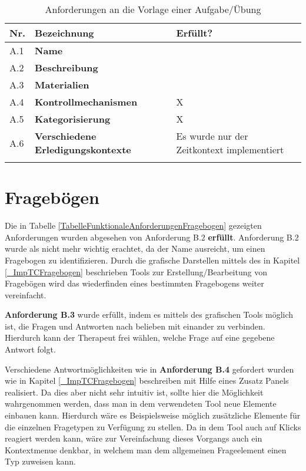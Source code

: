 \begin{table}[htbp]
	\begin{center}
		\begin{tabular}{p{} p{} p{}}
			\rowcolor{black!20} \textbf{Nr.} & \textbf{Bezeichnung} & \textbf{Erfüllt?} \\ \toprule 
			A.1 & \textbf{Name} & \checkmark \\ \hline \addlinespace
			A.2 & \textbf{Beschreibung} & \checkmark \\ \hline \addlinespace
			A.3 & \textbf{Materialien} & \checkmark \\ \hline \addlinespace
			A.4 & \textbf{Kontrollmechanismen} & X \\ \hline \addlinespace
			A.5 & \textbf{Kategorisierung} & X  \\ \hline \addlinespace
			A.6 & \textbf{Verschiedene Erledigungskontexte} & Es wurde nur der Zeitkontext implementiert \\ \hline \addlinespace
		\end{tabular}
	\end{center}
	\caption[Anforderungen an die Vorlage einer Aufgabe/Übung]{Anforderungen an die Vorlage einer Aufgabe/Übung}
	\label{TabelleAnforderungsabgleichVorlagen}
\end{table}

\section{Fragebögen}
Die in Tabelle \ref{TabelleFunktionaleAnforderungenFragebogen} gezeigten Anforderungen wurden abgesehen von Anforderung B.2 \textbf{erfüllt}. Anforderung B.2 wurde als nicht mehr wichtig erachtet, da der Name ausreicht, um einen Fragebogen zu identifizieren. Durch die grafische Darstellen mittels des in Kapitel \ref{_ImpTCFragebogen} beschrieben Tools zur Erstellung/Bearbeitung von Fragebögen wird das wiederfinden eines bestimmten Fragebogens weiter vereinfacht.

\textbf{Anforderung B.3} wurde erfüllt, indem es mittels des grafischen Tools möglich ist, die Fragen und Antworten nach belieben mit einander zu verbinden. Hierdurch kann der Therapeut frei wählen, welche Frage auf eine gegebene Antwort folgt.

Verschiedene Antwortmöglichkeiten wie in \textbf{Anforderung B.4} gefordert wurden wie in Kapitel \ref{_ImpTCFragebogen} beschreiben mit Hilfe eines Zusatz Panels realisiert. Da dies aber nicht sehr intuitiv ist, sollte hier die Möglichkeit wahrgenommen werden, dass man in dem verwendeten Tool neue Elemente einbauen kann. Hierdurch wäre es Beispielsweise möglich zusätzliche Elemente für die einzelnen Fragetypen zu Verfügung zu stellen. Da in dem Tool auch auf Klicks reagiert werden kann, wäre zur Vereinfachung dieses Vorgangs auch ein Kontextmenue denkbar, in welchem man dem allgemeinen Frageelement einen Typ zuweisen kann.



